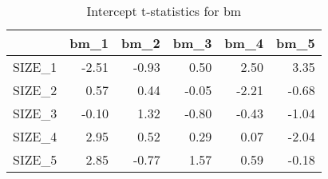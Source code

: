 \begin{table}[ht]
\centering
\caption{Intercept t-statistics for bm} 
\begin{tabular}{rrrrrr}
  \hline
 & bm\_1 & bm\_2 & bm\_3 & bm\_4 & bm\_5 \\ 
  \hline
SIZE\_1 & -2.51 & -0.93 & 0.50 & 2.50 & 3.35 \\ 
  SIZE\_2 & 0.57 & 0.44 & -0.05 & -2.21 & -0.68 \\ 
  SIZE\_3 & -0.10 & 1.32 & -0.80 & -0.43 & -1.04 \\ 
  SIZE\_4 & 2.95 & 0.52 & 0.29 & 0.07 & -2.04 \\ 
  SIZE\_5 & 2.85 & -0.77 & 1.57 & 0.59 & -0.18 \\ 
   \hline
\end{tabular}
\end{table}


